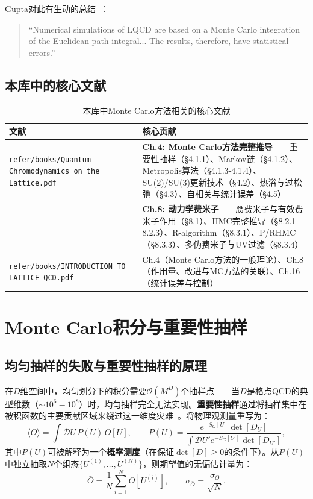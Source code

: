 \documentclass[12pt,a4paper]{ctexart}
\theoremstyle{definition}
\begin{document}
Gupta对此有生动的总结~\cite{Gupta1997intro}：
\begin{quote}
``Numerical simulations of LQCD are based on a Monte Carlo integration of the Euclidean path integral... The results, therefore, have statistical errors.''
\end{quote}

\subsection{本库中的核心文献}

\begin{table}[H]
\centering
\caption{本库中Monte Carlo方法相关的核心文献}
\label{tab:mc_papers}
\small
\begin{tabular}{lp{9cm}}
\toprule
文献 & 核心贡献 \\
\midrule
\texttt{refer/books/Quantum Chromodynamics on the Lattice.pdf}~\cite{GattringerLang2010} &
\textbf{Ch.4: Monte Carlo方法完整推导}——重要性抽样（§4.1.1）、Markov链（§4.1.2）、Metropolis算法（§4.1.3-4.1.4）、SU(2)/SU(3)更新技术（§4.2）、热浴与过松弛（§4.3）、自相关与统计误差（§4.5）\\
& \textbf{Ch.8: 动力学费米子}——赝费米子与有效费米子作用（§8.1）、HMC完整推导（§8.2.1-8.2.3）、R-algorithm（§8.3.1）、P/RHMC（§8.3.3）、多伪费米子与UV过滤（§8.3.4）\\
\texttt{refer/books/INTRODUCTION TO LATTICE QCD.pdf}~\cite{Gupta1997intro} &
Ch.4（Monte Carlo方法的一般理论）、Ch.8（作用量、改进与MC方法的关联）、Ch.16（统计误差与控制）\\
\bottomrule
\end{tabular}
\end{table}

\section{Monte Carlo积分与重要性抽样}

\subsection{均匀抽样的失败与重要性抽样的原理}

在$D$维空间中，均匀划分下的积分需要$\mathcal{O}(M^D)$个抽样点——当$D$是格点QCD的典型维数（$\sim 10^6-10^8$）时，均匀抽样完全无法实现。\textbf{重要性抽样}通过将抽样集中在被积函数的主要贡献区域来绕过这一维度灾难~\cite{GattringerLang2010}。将物理观测量重写为：
\begin{equation}
\langle O \rangle = \int \mathcal{D}U \, P(U) \, O[U], \qquad P(U) = \frac{e^{-S_G[U]} \det[D_U]}{\int \mathcal{D}U' e^{-S_G[U']} \det[D_{U'}]},
\label{eq:importance_sampling}
\end{equation}
其中$P(U)$可被解释为一个\textbf{概率测度}（在保证$\det[D]\ge 0$的条件下）。从$P(U)$中独立抽取$N$个组态$\{U^{(1)},\dots,U^{(N)}\}$，则期望值的无偏估计量为：
\begin{equation}
\bar O = \frac{1}{N} \sum_{i=1}^N O[U^{(i)}], \qquad \sigma_{\bar O} = \frac{\sigma_O}{\sqrt{N}}.
\label{eq:MC_estimator}
\end{equation}
\end{document}
